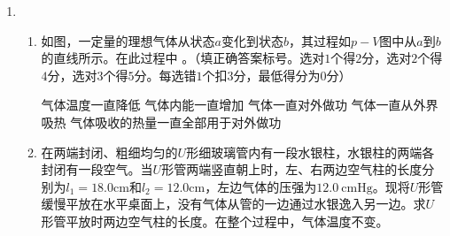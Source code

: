 \begin{enumerate}[leftmargin=0em]
\begin{enumerate}




\end{enumerate}


\newpage
\item 
{}
\begin{enumerate}
\renewcommand{\labelenumi}{\arabic{enumi}.}
\item
如图，一定量的理想气体从状态$ a $变化到状态$ b $，其过程如$ p-V $图中从$ a $到$ b $的直线所示。在此过程中  
。（填正确答案标号。选对$ 1 $个得$ 2 $分，选对$ 2 $个得$ 4 $分，选对$ 3 $个得$ 5 $分。每选错$ 1 $个扣$ 3 $分，最低得分为$ 0 $分）
\begin{figure}[h!]
\centering

\end{figure}

\fivechoices
{气体温度一直降低}
{气体内能一直增加}
{气体一直对外做功}
{气体一直从外界吸热}
{气体吸收的热量一直全部用于对外做功}

\item 
在两端封闭、粗细均匀的$ U $形细玻璃管内有一段水银柱，水银柱的两端各封闭有一段空气。当$ U $形管两端竖直朝上时，左、右两边空气柱的长度分别为$l _ { 1 } = 18.0 \mathrm { cm }$和$l _ { 2 } = 12.0 \mathrm { cm }$，左边气体的压强为$12.0\ \mathrm { cmHg }$。现将$ U $形管缓慢平放在水平桌面上，没有气体从管的一边通过水银逸入另一边。求$ U $形管平放时两边空气柱的长度。在整个过程中，气体温度不变。
\begin{figure}[h!]
\flushright

\end{figure}






\end{enumerate}



\end{enumerate}
